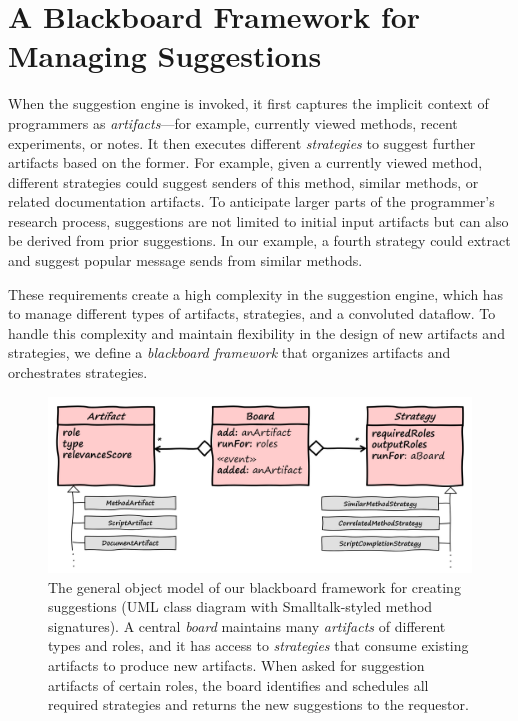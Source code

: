 
\section{A Blackboard Framework for Managing Suggestions}
\label{sec:design/suggestions}

When the suggestion engine is invoked, it first captures the implicit context of programmers as \emph{artifacts}---for example, currently viewed methods, recent experiments, or notes.
It then executes different \emph{strategies} to suggest further artifacts based on the former.
For example, given a currently viewed method, different strategies could suggest senders of this method, similar methods, or related documentation artifacts.
To anticipate larger parts of the programmer's research process, suggestions are not limited to initial input artifacts but can also be derived from prior suggestions.
In our example, a fourth strategy could extract and suggest popular message sends from similar methods.

These requirements create a high complexity in the suggestion engine, which has to manage different types of artifacts, strategies, and a convoluted dataflow.
To handle this complexity and maintain flexibility in the design of new artifacts and strategies, we define a \emph{blackboard framework} that organizes artifacts and orchestrates strategies.

\begin{figure}
	\centering
	\includegraphics[width=\textwidth]{02_suggestions/classes.png}
	\caption[The general object model of our \emph{blackboard framework} for creating suggestions.]{
		The general object model of our blackboard framework for creating suggestions (UML class diagram with Smalltalk-styled method signatures).
		A central \emph{board} maintains many \emph{artifacts} of different types and roles, and it has access to \emph{strategies} that consume existing artifacts to produce new artifacts.
		When asked for suggestion artifacts of certain roles, the board identifies and schedules all required strategies and returns the new suggestions to the requestor.
	}
	\label{fig:design/suggestions/classes}
\end{figure}

